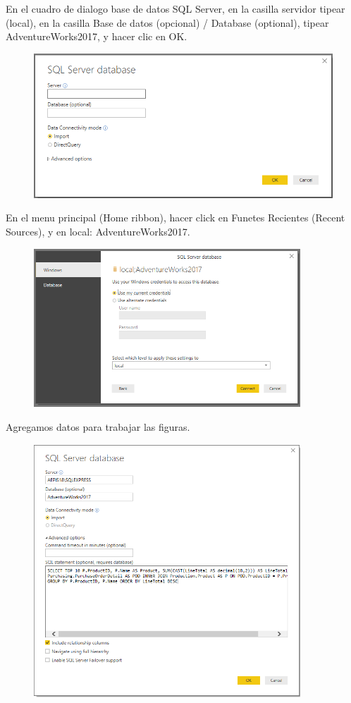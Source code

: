 {\item{  En el cuadro de dialogo base de datos SQL Server, en la casilla servidor tipear (local), en la casilla Base de
datos (opcional) / Database (optional), tipear AdventureWorks2017, y hacer clic en OK. }
\begin{figure}[httb]
\begin{center}
\includegraphics[width=15cm]{./Imagenes/image003}
\end{center}
\end{figure}
\newpage
\item{ En el menu principal (Home ribbon), hacer click en Funetes Recientes (Recent Sources), y en local:
AdventureWorks2017. }
\begin{figure}[httb]
\begin{center}
\includegraphics[width=10cm]{./Imagenes/image005}
\end{center}
\end{figure}
\item{ Agregamos datos para trabajar las figuras. }
\begin{figure}[httb]
\begin{center}
\includegraphics[width=10cm]{./Imagenes/image015}

\end{center}
\end{figure}}
